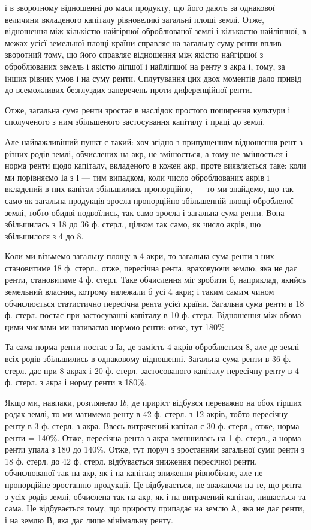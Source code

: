 \parcont{}  %
і в зворотному відношенні до маси продукту, що його дають за однакової величини
вкладеного капіталу рівновеликі загальні площі землі. Отже, відношення між
кількістю найгіршої оброблюваної землі і кількостю найліпшої, в межах усієї
земельної площі країни справляє на загальну суму ренти вплив зворотний
тому, що його справляє відношення між якістю найгіршої з оброблюваних земель
і якістю ліпшої і найліпшої на ренту з акра і, тому, за інших рівних
умов і на суму ренти. Сплутування цих двох моментів дало привід до всеможливих
безглуздих заперечень проти диференційної ренти.

Отже, загальна сума ренти зростає в наслідок простого поширення культури
і сполученого з ним збільшеного застосування капіталу і праці до землі.

Але найважливіший пункт є такий: хоч згідно з припущенням відношення
рент з різних родів землі, обчислених на акр, не змінюється, а тому
не змінюється і норма ренти щодо капіталу, вкладеного в кожен акр, проте
виявляється таке: коли ми порівняємо І$а$ з І — тим випадком, коли число оброблюваних
акрів і вкладений в них капітал збільшились пропорційно, — то ми знайдемо,
що так само як загальна продукція зросла пропорційно збільшенній площі
обробленої землі, тобто обидві подвоїлись, так само зросла і загальна сума ренти.
Вона збільшилась з 18 до 36 ф. стерл., цілком так само, як число акрів, що
збільшилося з 4 до 8.

Коли ми візьмемо загальну площу в 4 акри, то загальна сума ренти з них
становитиме 18 ф. стерл., отже, пересічна рента, враховуючи землю, яка не дає
ренти, становитиме 4 ф. стерл. Таке обчислення міг зробити б, наприклад,
якийсь земельний власник, котрому належали б усі 4 акри; і таким самим
чином обчислюється статистично пересічна рента усієї країни. Загальна сума
ренти в 18 ф. стерл. постає при застосуванні капіталу в 10 ф. стерл.
Відношення між обома цими числами ми називаємо нормою ренти: отже, тут
180\%

Та сама норма ренти постає з І$а$, де замість 4 акрів обробляється 8,
але де землі всіх родів збільшились в однаковому відношенні. Загальна сума
ренти в 36 ф. стерл. дає при 8 акрах і 20 ф. стерл. застосованого капіталу
пересічну ренту в 4 ф. стерл. з акра і норму ренти в 180\%.

Якщо ми, навпаки, розглянемо І$b$, де приріст відбувся переважно на обох
гірших родах землі, то ми матимемо ренту в 42 ф. стерл. з 12 акрів, тобто
пересічну ренту в 3 ф. стерл. з акра. Ввесь витрачений капітал є 30 ф. стерл.,
отже, норма ренти = 140\%. Отже, пересічна рента з акра зменшилась на 1 ф.
стерл., а норма ренти упала з 180 до 140\%. Отже, тут поруч з зростанням
загальної суми ренти з 18 ф. стерл. до 42 ф. стерл. відбувається зниження
пересічної ренти, обчислюваної так на акр, як і на капітал; зниження рівнобіжне,
але не пропорційне зростанню продукції. Це відбувається, не зважаючи на те,
що рента з усіх родів землі, обчислена так на акр, як і на витрачений капітал,
лишається та сама. Це відбувається тому, що  приросту припадає на
землю $А$, яка не дає ренти, і на землю $В$, яка дає лише мінімальну ренту.

